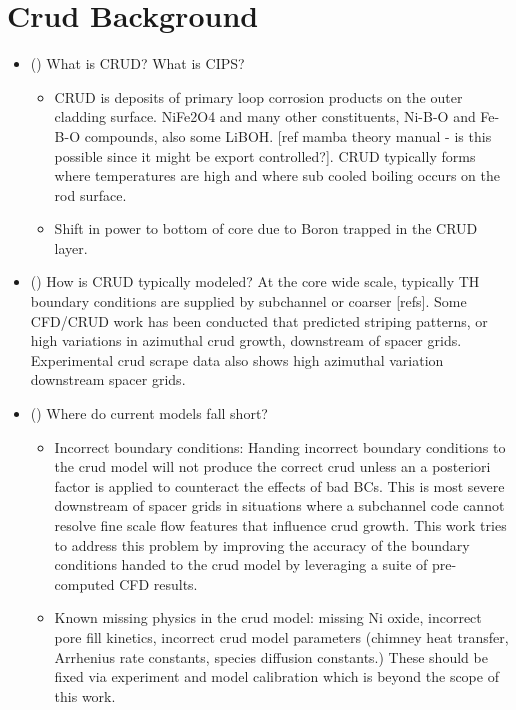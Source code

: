 
\section{Crud Background}

\begin{itemize}
        \item (\checkmark) What is CRUD?  What is CIPS?
                \begin{itemize}
                \item CRUD is deposits of primary loop corrosion products on the outer cladding surface.  NiFe2O4 and many other constituents, Ni-B-O and Fe-B-O compounds, also some LiBOH. [ref mamba theory manual - is this possible since it might be export controlled?].  CRUD  typically forms where temperatures are high and where sub cooled boiling occurs on the rod surface.
                \item Shift in power to bottom of core due to Boron trapped in the CRUD layer.
                \end{itemize}
        \item (\checkmark) How is CRUD typically modeled?  At the core wide scale, typically TH boundary conditions are supplied by subchannel or coarser [refs].  Some CFD/CRUD work has been conducted that predicted striping patterns, or high variations in azimuthal crud growth, downstream of spacer grids.  Experimental crud scrape data also shows high azimuthal variation downstream spacer grids.
        \item (\checkmark) Where do current models fall short?
        \begin{itemize}
                \item Incorrect boundary conditions: Handing incorrect boundary conditions to the crud model will not produce the correct crud unless an a posteriori factor is applied to counteract the effects of bad BCs.  This is most severe downstream of spacer grids in situations where a subchannel code cannot resolve fine scale flow features that influence crud growth.  This work tries to address this problem by improving the accuracy of the boundary conditions handed to the crud model by leveraging a suite of pre-computed CFD results.
                \item Known missing physics in the crud model: missing Ni oxide, incorrect pore fill kinetics, incorrect crud model parameters (chimney heat transfer, Arrhenius rate constants, species diffusion constants.) These should be fixed via experiment and model calibration which is beyond the scope of this work.
        \end{itemize}
\end{itemize}

